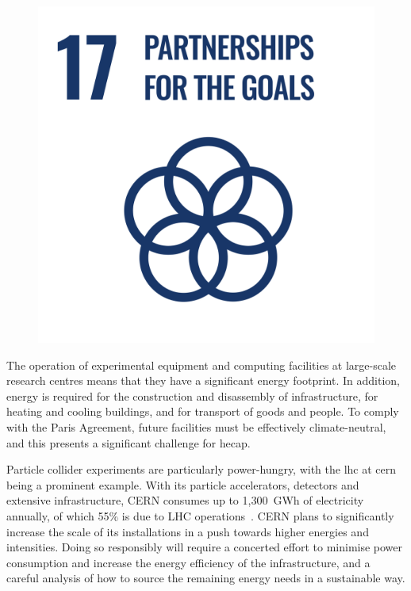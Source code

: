 \documentclass[../SustainableHEP.tex]{subfiles}
\begin{document}
\begin{figure}
\includegraphics[width=\SDGsize]{Sections/Figs/Common/SDG_17_PartnershipForGoals.png}

\end{figure}


\noindent
The operation of experimental equipment and computing facilities at large-scale research centres means that they have a significant energy footprint. 
In addition, energy is required for the construction and disassembly of infrastructure, for heating and cooling buildings, and for transport of goods and people. To comply with the Paris Agreement, future facilities must be effectively climate-neutral, and this presents a significant challenge for \acrshort{hecap}.

Particle collider experiments are particularly power-hungry, with the \acrshort{lhc} at \acrshort{cern} being a prominent example. With its particle accelerators, detectors and extensive infrastructure, CERN consumes up to 1,300~GWh of electricity annually, of which 55\% is due to LHC operations~\cite{Environment:2737239,CERNenergymanagement}. CERN plans to significantly increase the scale of its installations in a push towards higher energies and intensities. Doing so responsibly will require a concerted effort to minimise power consumption and increase the energy efficiency of the infrastructure, and a careful analysis of how to source the remaining energy needs in a sustainable way.
\end{document}
